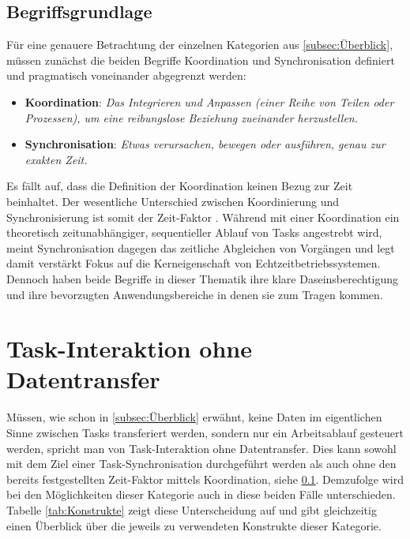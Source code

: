 \documentclass{llncs}
\begin{document}
\subsection{Begriffsgrundlage}
\label{subsec:Begriffsgrundlage}
Für eine genauere Betrachtung der einzelnen Kategorien aus \ref{subsec:Überblick}, müssen zunächst die beiden Begriffe Koordination und Synchronisation definiert und pragmatisch voneinander abgegrenzt werden:
\begin{itemize}
	\setlength\itemsep{1em} %
	\item \textbf{Koordination}: \textit{\glqq Das Integrieren und Anpassen (einer Reihe von Teilen oder Prozessen), um eine reibungslose Beziehung zueinander herzustellen.\grqq} \autocite[80]{Cooling2017}
	\item \textbf{Synchronisation}: \textit{\glqq Etwas verursachen, bewegen oder ausführen, genau zur exakten Zeit.\grqq} \autocite[80]{Cooling2017}
\end{itemize}
Es fällt auf, dass die Definition der Koordination keinen Bezug zur Zeit beinhaltet. Der wesentliche Unterschied zwischen Koordinierung und Synchronisierung ist somit der Zeit-Faktor \autocite[vgl.][80]{Cooling2017}. Während mit einer Koordination ein theoretisch zeitunabhängiger, sequentieller Ablauf von Tasks angestrebt wird, meint Synchronisation dagegen das zeitliche Abgleichen von Vorgängen und legt damit verstärkt Fokus auf die Kerneigenschaft von Echtzeitbetriebssystemen. Dennoch haben beide Begriffe in dieser Thematik ihre klare Daseinsberechtigung und ihre bevorzugten Anwendungsbereiche in denen sie zum Tragen kommen.

\section{Task-Interaktion ohne Datentransfer}
\label{sub:Task_Interaktion_ohne_Datentransfer}
Müssen, wie schon in \ref{subsec:Überblick} erwähnt, keine Daten im eigentlichen Sinne zwischen Tasks transferiert werden, sondern nur ein Arbeitsablauf gesteuert werden, spricht man von Task-Interaktion ohne Datentransfer. Dies kann sowohl mit dem Ziel einer Task-Synchronisation durchgeführt werden als auch ohne den bereits festgestellten Zeit-Faktor mittels Koordination, siehe \ref{subsec:Begriffsgrundlage}. Demzufolge wird bei den Möglichkeiten dieser Kategorie auch in diese beiden Fälle unterschieden. Tabelle \ref{tab:Konstrukte} zeigt diese Unterscheidung auf und gibt gleichzeitig einen Überblick über die jeweils zu verwendeten Konstrukte dieser Kategorie.
\end{document}
